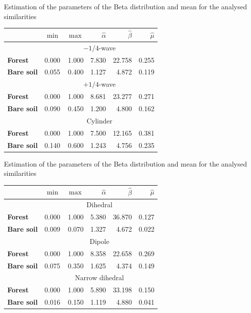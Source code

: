 \documentclass[10pt]{beamer}
\begin{document}
\begin{frame}[fragile]{Estimation of the parameters of the Beta distribution and mean for the analysed similarities}
    \begin{table}[hbt]
    \centering
    \begin{tabular}{lrrrrr}
    \toprule
    & $\min$ & $\max$ & $\widehat\alpha$ & $\widehat\beta$ & $\widehat\mu$\\ \midrule
    & \multicolumn{5}{c}{$-1/4$-wave}\\
    \cmidrule(lr){2-6}
    \textbf{Forest} & 0.000 & 1.000 & 7.830 & 22.758 & 0.255\\
    \textbf{Bare soil} & 0.055 & 0.400 & 1.127 & 4.872 & 0.119\\
    \midrule
    & \multicolumn{5}{c}{$+1/4$-wave}\\
    \cmidrule(lr){2-6}
    \textbf{Forest} & 0.000 & 1.000 & 8.681 & 23.277 & 0.271\\
    \textbf{Bare soil} & 0.090 & 0.450 & 1.200 & 4.800 & 0.162\\
    \midrule
    & \multicolumn{5}{c}{Cylinder}\\
    \cmidrule(lr){2-6}
    \textbf{Forest} & 0.000 & 1.000 & 7.500 & 12.165 & 0.381\\
    \textbf{Bare soil} & 0.140 & 0.600 & 1.243 & 4.756 & 0.235\\
    \bottomrule
    \end{tabular}
    \end{table}
\end{frame}

\begin{frame}[fragile]{Estimation of the parameters of the Beta distribution and mean for the analysed similarities}
    \begin{table}[hbt]
    \centering
    \begin{tabular}{lrrrrr}
    \toprule
    & $\min$ & $\max$ & $\widehat\alpha$ & $\widehat\beta$ & $\widehat\mu$\\ \midrule
    & \multicolumn{5}{c}{Dihedral}\\
    \cmidrule(lr){2-6}
    \textbf{Forest} & 0.000 & 1.000 & 5.380 & 36.870 & 0.127\\
    \textbf{Bare soil} & 0.009 & 0.070 & 1.327 & 4.672 & 0.022\\
    \midrule
    & \multicolumn{5}{c}{Dipole}\\
    \cmidrule(lr){2-6}
    \textbf{Forest} & 0.000 & 1.000 & 8.358 & 22.658 & 0.269\\
    \textbf{Bare soil} & 0.075 & 0.350 & 1.625 & 4.374 & 0.149\\
    \midrule
    & \multicolumn{5}{c}{Narrow dihedral}\\
    \cmidrule(lr){2-6}
    \textbf{Forest} & 0.000 & 1.000 & 5.890 & 33.198 & 0.150\\
    \textbf{Bare soil} & 0.016 & 0.150 & 1.119 & 4.880 & 0.041\\
    \bottomrule
    \end{tabular}
    \end{table}
\end{frame}
\end{document}
